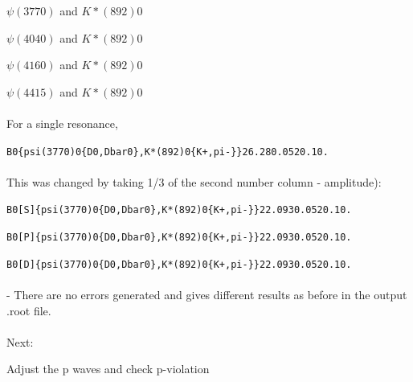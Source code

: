 $\psi(3770)$ and $K*(892)0$

$\psi(4040)$ and $K*(892)0$

$\psi(4160)$ and $K*(892)0$

$\psi(4415)$ and $K*(892)0$
\\
\\
For a single resonance, 

\texttt{B0\{psi(3770)0\{D0,Dbar0\},K*(892)0\{K+,pi-\}\}\hspace{0.4cm}2\hspace{0.4cm}6.28\hspace{0.4cm}0.05\hspace{0.4cm}2\hspace{0.4cm}0.\hspace{0.4cm}10.}
\\
\\
This was changed by taking 1/3 of the second number column - amplitude):

\texttt{B0[S]\{psi(3770)0\{D0,Dbar0\},K*(892)0\{K+,pi-\}\}\hspace{0.4cm}2\hspace{0.4cm}2.093\hspace{0.4cm}0.05\hspace{0.4cm}2\hspace{0.4cm}0.\hspace{0.4cm}10.}

\texttt{B0[P]\{psi(3770)0\{D0,Dbar0\},K*(892)0\{K+,pi-\}\}\hspace{0.4cm}2\hspace{0.4cm}2.093\hspace{0.4cm}0.05\hspace{0.4cm}2\hspace{0.4cm}0.\hspace{0.4cm}10.}

\texttt{B0[D]\{psi(3770)0\{D0,Dbar0\},K*(892)0\{K+,pi-\}\}\hspace{0.4cm}2\hspace{0.4cm}2.093\hspace{0.4cm}0.05\hspace{0.4cm}2\hspace{0.4cm}0.\hspace{0.4cm}10.}
\\
\\
 - There are no errors generated and gives different results as before in the output .root file.
\\
\\
Next:

Adjust the p waves and check p-violation

